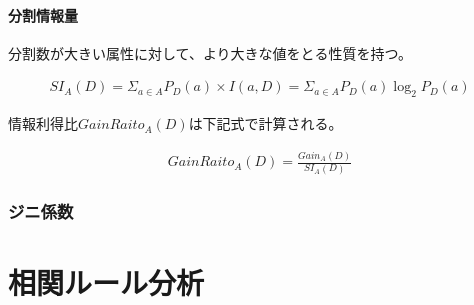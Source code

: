 \documentclass[dvipdfmx]{jsarticle}
\begin{document}
\paragraph{分割情報量}分割数が大きい属性に対して、より大きな値をとる性質を持つ。
\begin{center}
  \begin{align*}
    SI_{A}(D) = \Sigma_{a\in A}P_{D}(a) \times I(a, D) = \Sigma_{a\in A}P_{D}(a)\log_2 P_{D}(a)
  \end{align*}
\end{center}
情報利得比$GainRaito_{A}(D)$は下記式で計算される。
\begin{center}
  \begin{align*}
    GainRaito_{A}(D) = \frac{Gain_{A}(D)}{SI_{A}(D)}
  \end{align*}
\end{center}
\subsubsection{ジニ係数}







\section{相関ルール分析}
\end{document}
